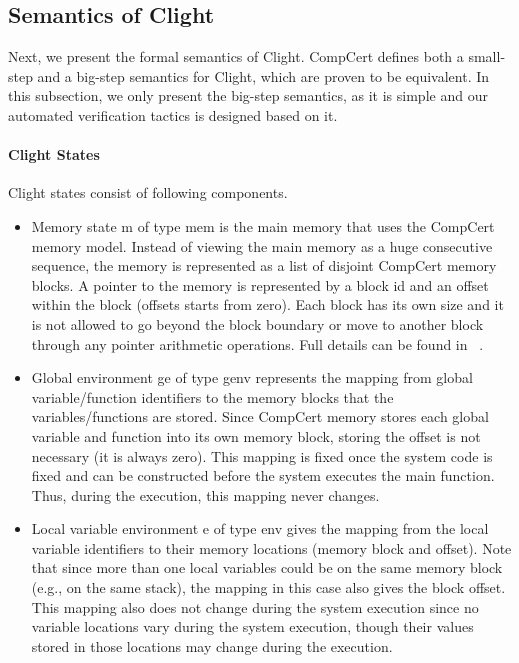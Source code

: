 \subsection{Semantics of Clight}

Next, we present the formal semantics of Clight. CompCert defines
both a small-step and a big-step semantics for Clight, which are proven
to be equivalent. In this subsection,
we only present the big-step semantics, as it is simple and our automated
verification tactics is designed based on it.

\paragraph{Clight States}
Clight states consist of following components.
\begin{itemize}[leftmargin=*]

\item Memory state \textsf{m} of type \textsf{mem} is the main memory
that uses the CompCert memory model. Instead of viewing the main memory
as a huge consecutive sequence, the memory is represented as a list of
disjoint CompCert memory blocks. A pointer to the memory is represented
by a block id and an offset within the block (offsets starts from zero).
Each block has its own size and it is not allowed to go beyond the block boundary
or move to another block through any pointer arithmetic operations.
Full details can be found in ~\cite{leroy08}.  

\item Global environment \textsf{ge} of type \textsf{genv} represents the mapping
from global variable/function identifiers to the memory blocks that the variables/functions
are stored. Since CompCert memory stores each global variable and function into
its own memory block, storing the offset is not necessary (it is always zero).
This mapping is fixed once the system code is fixed and can be constructed
before the system executes the main function. Thus, during the execution, 
this mapping never changes.

\item Local variable environment \textsf{e} of type \textsf{env} gives the
mapping from the local variable identifiers to their memory locations
(memory block and offset). Note that since more than one local variables
could be on the same memory block (e.g., on the same stack), the mapping
in this case also gives the block offset. This mapping also does not change
during the system execution since no variable locations vary during the system
execution, though their values stored in those locations may change during the
execution.


\end{itemize}
